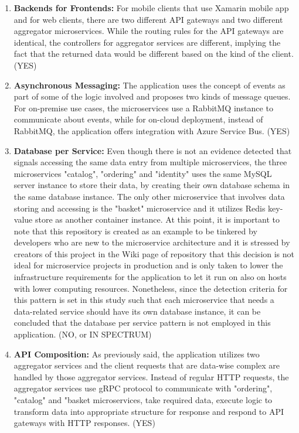 \documentclass{Configuration_Files/PoliMi3i_thesis}
\begin{document}
\begin{enumerate}
    \item \textbf{Backends for Frontends:} For mobile clients that use Xamarin mobile app and for web clients, there are two different API gateways and two different aggregator microservices.
    While the routing rules for the API gateways are identical, the controllers for aggregator services are different, implying the fact that the returned data would be different based on the kind of the client. (YES)
    
    \item \textbf{Asynchronous Messaging:} The application uses the concept of events as part of some of the logic involved and proposes two kinds of message queues.
    For on-premise use cases, the microservices use a RabbitMQ instance to communicate about events, while for on-cloud deployment, instead of RabbitMQ, the application offers integration with Azure Service Bus. (YES)
    
    \item \textbf{Database per Service:} Even though there is not an evidence detected that signals accessing the same data entry from multiple microservices, the three microservices "catalog", "ordering" and "identity" uses the same MySQL server instance to store their data, by creating their own database schema in the same database instance.
    The only other microservice that involves data storing and accessing is the "basket" microservice and it utilizes Redis key-value store as another container instance.
    At this point, it is important to note that this repository is created as an example to be tinkered by developers who are new to the microservice architecture and it is stressed by creators of this project in the Wiki page of repository that this decision is not ideal for microservice projects in production and is only taken to lower the infrastructure requirements for the application to let it run on also on hosts with lower computing resources.
    Nonetheless, since the detection criteria for this pattern is set in this study such that each microservice that needs a data-related service should have its own database instance, it can be concluded that the database per service pattern is not employed in this application. (NO, or IN SPECTRUM)
    
    \item \textbf{API Composition:} As previously said, the application utilizes two aggregator services and the client requests that are data-wise complex are handled by those aggregator services.
    Instead of regular HTTP requests, the aggregator services use gRPC protocol to communicate with "ordering", "catalog" and "basket microservices, take required data, execute logic to transform data into appropriate structure for response and respond to API gateways with HTTP responses. (YES)
    

\end{enumerate}
\end{document}

